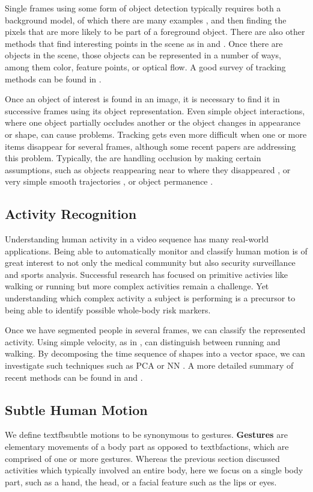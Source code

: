 \documentclass[11pt]{article}
\begin{document}
Single frames using some form of object detection typically requires both a background model, of which there are many examples \cite{Elgammal} \cite{Stauffer}, and then finding the pixels that are more likely to be part of a foreground object. There are also other methods that find interesting points in the scene as in \cite{tomasi1991} and \cite{lowe2004}. Once there are objects in the scene, those objects can be represented in a number of ways, among them color, feature points, or optical flow. A good survey of tracking methods can be found in \cite{yilmaz2006}.

Once an object of interest is found in an image, it is necessary to find it in successive frames using its object representation. Even simple object interactions, where one object partially occludes another or the object changes in appearance or shape, can cause problems. Tracking gets even more difficult when one or more items disappear for several frames, although some recent papers are addressing this problem. Typically, the are handling occlusion by making certain assumptions, such as objects reappearing near to where they disappeared \cite{papadourakis2010}, or very simple smooth trajectories \cite{iraei2015}, or object permanence \cite{huang2005}.

\subsection{Activity Recognition}
Understanding human activity in a video sequence has many real-world applications. Being able to automatically monitor and classify human motion is of great interest to not only the medical community but also security surveillance and sports analysis. Successful research has focused on primitive activies like walking or running but more complex activities remain a challenge. Yet understanding which complex activity a subject is performing is a precursor to being able to identify possible whole-body risk markers.

Once we have segmented people in several frames, we can classify the represented activity. Using simple velocity, as in \cite{bodor2003}, can distinguish between running and walking. By decomposing the time sequence of shapes into a vector space, we can investigate such techniques such as PCA \cite{masoud2003} or NN \cite{blank2005}. A more detailed summary of recent methods can be found in \cite{poppe2010} and \cite{aggarwal2011}.

\subsection{Subtle Human Motion}
We define textfb{subtle motions} to be synonymous to gestures. \textbf{Gestures} are elementary movements of a body part as opposed to textbf{actions}, which are comprised of one or more gestures. Whereas the previous section discussed activities which typically involved an entire body, here we focus on a single body part, such as a hand, the head, or a facial feature such as the lips or eyes.
\end{document}
